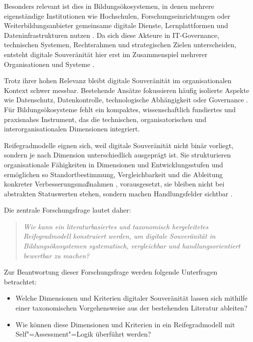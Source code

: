 \documentclass[10pt,a4paper]{article}
\begin{document}
Besonders relevant ist dies in Bildungsökosystemen, in denen mehrere eigenständige Institutionen wie Hochschulen, Forschungseinrichtungen oder Weiterbildungsanbieter gemeinsame digitale Dienste, Lernplattformen und Dateninfrastrukturen nutzen \cite{BM24a,MC24}. Da sich diese Akteure in IT-Governance, technischen Systemen, Rechtsrahmen und strategischen Zielen unterscheiden, entsteht digitale Souveränität hier erst im Zusammenspiel mehrerer Organisationen und Systeme \cite{OJ19,Op25,SHO24}.

Trotz ihrer hohen Relevanz bleibt digitale Souveränität im organisationalen Kontext schwer messbar. Bestehende Ansätze fokussieren häufig isolierte Aspekte wie Datenschutz, Datenkontrolle, technologische Abhängigkeit oder Governance \cite{Fr24,Ze26}. Für Bildungsökosysteme fehlt ein kompaktes, wissenschaftlich fundiertes und praxisnahes Instrument, das die technischen, organisatorischen und interorganisationalen Dimensionen integriert.

Reifegradmodelle eignen sich, weil digitale Souveränität nicht binär vorliegt, sondern je nach Dimension unterschiedlich ausgeprägt ist. Sie strukturieren organisationale Fähigkeiten in Dimensionen und Entwicklungsstufen und ermöglichen so Standortbestimmung, Vergleichbarkeit und die Ableitung konkreter Verbesserungsmaßnahmen \cite{dB05,BKP09,PR11}, vorausgesetzt, sie bleiben nicht bei abstrakten Statuswerten stehen, sondern machen Handlungsfelder sichtbar \cite{TB23}.

Die zentrale Forschungsfrage lautet daher:
\begin{quote}
\itshape
Wie kann ein literaturbasiertes und taxonomisch hergeleitetes Reifegradmodell konstruiert werden, um digitale Souveränität in Bildungsökosystemen systematisch, vergleichbar und handlungsorientiert bewertbar zu machen?
\end{quote}

Zur Beantwortung dieser Forschungsfrage werden folgende Unterfragen betrachtet:
\begin{itemize}[leftmargin=1.8em,itemsep=0.15em]
  \item Welche Dimensionen und Kriterien digitaler Souveränität lassen sich mithilfe einer taxonomischen Vorgehensweise aus der bestehenden Literatur ableiten?
  \item Wie können diese Dimensionen und Kriterien in ein Reifegradmodell mit Self"=Assessment"=Logik überführt werden?
\end{itemize}
\end{document}
